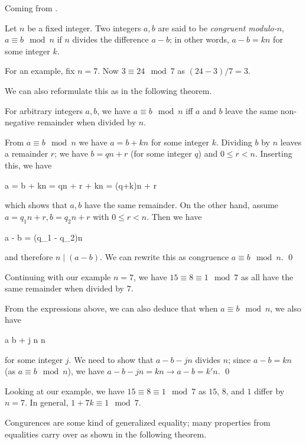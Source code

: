 
Coming from \cite{Burton2011}.

\begin{definition}
    Let $n$ be a fixed integer. Two integers $a, b$ are said to be \emph{congruent modulo-$n$}, $a \equiv b \mod n$ if $n$ divides the difference $a - b$; in other words, $a - b = kn$ for some integer $k$.
\end{definition}

For an example, fix $n = 7$. Now $3 \equiv 24 \mod 7$ as $(24-3) / 7 = 3$.

We can also reformulate this as in the following theorem.

\begin{theorem}
    For arbitrary integers $a, b$, we have $a \equiv b \mod n$ iff $a$ and $b$ leave the same non-negative remainder when divided by $n$.
\end{theorem}

From $a \equiv b \mod n$ we have $a = b + kn$ for some integer $k$. Dividing $b$ by $n$ leaves a remainder $r$; we have $b = qn + r$ (for some integer $q$) and $0 \leq r < n$. Inserting this, we have

\bee
a = b + kn = qn + r + kn = (q+k)n + r
\eee

which shows that $a, b$ have the same remainder. On the other hand, assume $a = q_1 n + r, b = q_2 n + r$ with $0 \leq r < n$. Then we have

\bee
a - b = (q_1 - q_2)n
\eee

and therefore $n \mid (a-b)$. We can rewrite this as congruence $a \equiv b \mod n$. \qed

Continuing with our example $n = 7$, we have $15 \equiv 8 \equiv 1 \mod 7$ as all have the same remainder when divided by $7$.

From the expressions above, we can also deduce that when $a \equiv b \mod n$, we also have 

\bee
a \equiv b + j n \mod n
\eee

for some integer $j$. We need to show that $a - b - jn$ divides $n$; since $a - b = kn$ (as $a \equiv b \mod n$), we have $a - b - jn = kn \rightarrow a - b = k'n$. \qed 

Looking at our example, we have $15 \equiv 8 \equiv 1 \mod 7$ as $15$, $8$, and $1$ differ by $n = 7$. In general, $1 + 7 k \equiv 1 \mod 7$.

Congurences are some kind of generalized equality; many properties from equalities carry over as shown in the following theorem.


